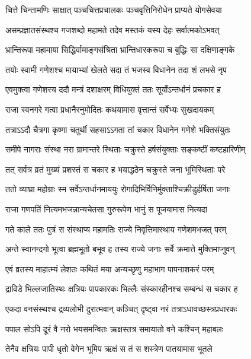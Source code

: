 \twolineshloka
{चित्ते चिन्तामणिः साक्षात् पञ्चचित्तप्रचालकः}
{पञ्चवृत्तिनिरोधेन प्राप्यते योगसेवया} %

\twolineshloka
{असम्प्रज्ञातसंस्थश्च गजशब्दो महामते}
{तदेव मस्तकं यस्य देहः सर्वात्मकोऽभवत्} %

\twolineshloka
{भ्रान्तिरूपा महामाया सिद्धिर्वामाङ्गसंश्रिता}
{भ्रान्तिधारकरूपा च बुद्धिः सा दक्षिणाङ्गके} %

\twolineshloka
{तयोः स्वामी गणेशश्च मायाभ्यां खेलते सदा}
{तं भजस्व विधानेन तदा शं लभसे नृप} %

\twolineshloka
{एवमुक्त्वा गणेशस्य ददौ मन्त्रं दशाक्षरम्}
{विधियुक्तं ततः सूर्योऽन्तर्धानं प्रचकार ह} %

\twolineshloka
{राजा स्वनगरे गत्वा प्रधानैरनुमोदितः}
{कथयामास वृत्तान्तं सर्वेभ्यः सुखदायकम्} %

\twolineshloka
{तत्राऽऽदौ चैत्रगा कृष्णा चतुर्थी सहसाऽऽगता}
{तां चकार विधानेन गणेशे भक्तिसंयुतः} %

\twolineshloka
{समीपे नागराः संस्था नरा ग्रामान्तरे स्थिताः}
{चक्रुस्ते हर्षसंयुक्ताः सङ्कष्टीं कष्टहारिणीम्} %

\twolineshloka
{तत् सर्वत्र व्रतं मुख्यं प्रशस्तं स चकार ह}
{भयाद्धठेन चक्रुस्ते जना भूमिस्थिताः परे} %

\twolineshloka
{ततो व्याघ्रा महोग्राः स्म सर्वेऽन्तर्धानमाययुः}
{रोगादिभिर्विनिर्मुक्ताश्चिक्रीडुर्हर्षिता जनाः} %

\twolineshloka
{राजा गणपतिं नित्यमभजन्नान्यचेतसा}
{गुरुरूपेण भानुं स पूजयामास नित्यदा} %

\twolineshloka
{गते काले ततः पुत्रं स संस्थाप्य महामतिः}
{राज्ये निवृत्तिमास्थाय गणेशमभजत् परम्} %

\twolineshloka
{अन्ते स्वानन्दगो भूत्वा ब्रह्मभूतो बभूव ह}
{तस्य राज्ये जनाः सर्वे क्रमात्ते मुक्तिमाप्नुवन्} %

\twolineshloka
{एवं व्रतस्य माहात्म्यं लेशतः कथितं मया}
{अन्यच्छृणु महाभाग पापनाशकरं परम्} %

\twolineshloka
{द्राविडे भिल्लजातिस्थः क्षत्रियः पापकारकः}
{भिल्लैः संस्कारहीनश्च सम्बन्धं स चकार ह} %

\twolineshloka
{एकदा वनसंस्थश्च द्रव्यलोभी दुरात्मवान्}
{कञ्चित् दृष्ट्वा नरं तत्राऽधावच्छस्त्रप्रधारकः} %

\twolineshloka
{पपाल सोऽपि दूरं वै नरो भयसमन्वितः}
{ऋक्षस्तत्र समायातो वने कश्चिन् महाबलः} %

\twolineshloka
{तेनैव क्षत्रियः पापी धृतो वेगेन भूमिप}
{ऋक्षं स तं स शस्त्रेण पातयामास भूतले} %

